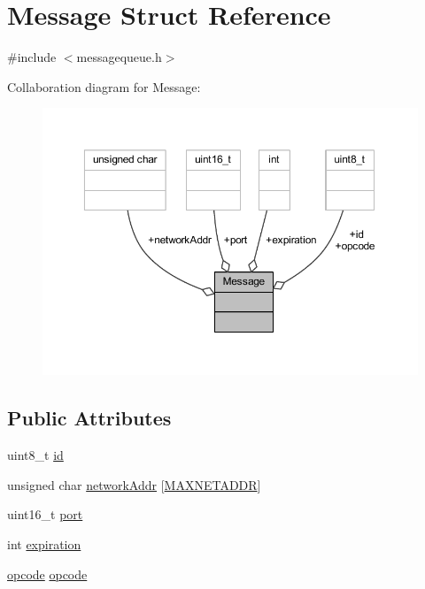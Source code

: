 \hypertarget{struct_message}{}\section{Message Struct Reference}
\label{struct_message}


{\ttfamily \#include $<$messagequeue.\+h$>$}



Collaboration diagram for Message\+:
\nopagebreak
\begin{figure}[H]
\begin{center}
\leavevmode
\includegraphics[width=350pt]{struct_message__coll__graph}
\end{center}
\end{figure}
\subsection*{Public Attributes}
\begin{DoxyCompactItemize}
\item 
uint8\+\_\+t \hyperlink{struct_message_ae61f86cd0691a3f02faa414da330a780}{id}
\item 
unsigned char \hyperlink{struct_message_a60e639c0a4a6bce92868038dcd729d83}{network\+Addr} \mbox{[}\hyperlink{packet_8h_a64e48eb75238bd3d7a053f19071044a8}{M\+A\+X\+N\+E\+T\+A\+D\+DR}\mbox{]}
\item 
uint16\+\_\+t \hyperlink{struct_message_a02bae243e9df49d0baaf486c03b908dd}{port}
\item 
int \hyperlink{struct_message_a32a531677df2b9665eea1d997293688f}{expiration}
\item 
\hyperlink{packet_8h_a5ce68aceddf17a30aa045fc04914e798}{opcode} \hyperlink{struct_message_a1b33863bc276c3766459cb2199492c89}{opcode}
\end{DoxyCompactItemize}


